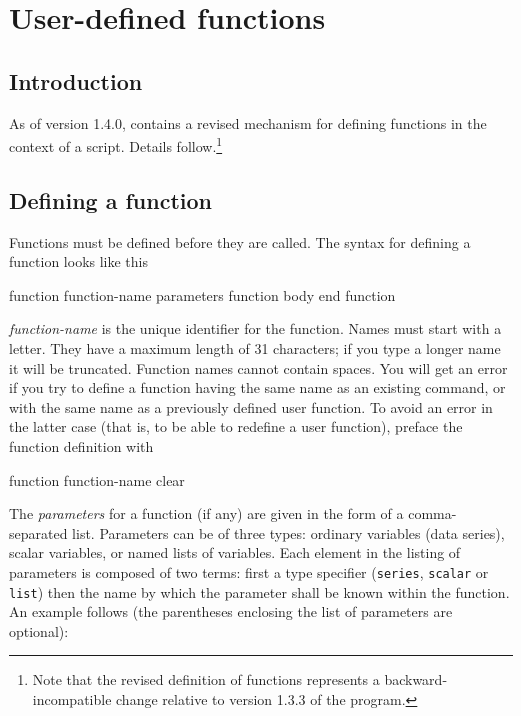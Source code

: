\chapter{User-defined functions}
\label{functions}

\section{Introduction}
\label{func-intro}

As of version 1.4.0,  contains a revised mechanism for
defining functions in the context of a script.  Details
follow.\footnote{Note that the revised definition of functions
  represents a backward-incompatible change relative to version 1.3.3
  of the program.}
    
\section{Defining a function}
\label{func-define}

Functions must be defined before they are called.  The syntax for
defining a function looks like this
    
\begin{code}
      function function-name parameters
         function body
      end function
\end{code}

\textsl{function-name} is the unique identifier for the function.
Names must start with a letter. They have a maximum length of 31
characters; if you type a longer name it will be truncated.  Function
names cannot contain spaces.  You will get an error if you try to
define a function having the same name as an existing 
command, or with the same name as a previously defined user function.
To avoid an error in the latter case (that is, to be able to redefine
a user function), preface the function definition with
    
\begin{code}
      function function-name clear
\end{code}

The \textsl{parameters} for a function (if any) are given in the form
of a comma-separated list.  Parameters can be of three types: ordinary
variables (data series), scalar variables, or named lists of
variables.  Each element in the listing of parameters is composed of
two terms: first a type specifier (\verb+series+, \verb+scalar+ or
\verb+list+) then the name by which the parameter shall be known
within the function.  An example follows (the parentheses enclosing
the list of parameters are optional):
    
